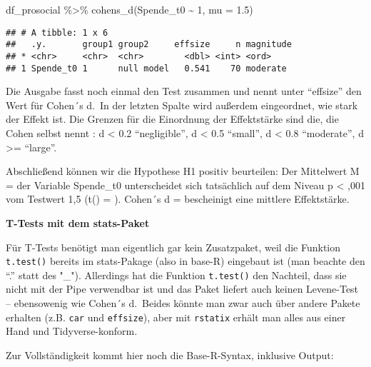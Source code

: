 \documentclass[
]{book}
\newenvironment{Shaded}{\begin{snugshade}}{\end{snugshade}}
\newcommand{\AttributeTok}[1]{\textcolor[rgb]{0.77,0.63,0.00}{#1}}
\newcommand{\DecValTok}[1]{\textcolor[rgb]{0.00,0.00,0.81}{#1}}
\newcommand{\FloatTok}[1]{\textcolor[rgb]{0.00,0.00,0.81}{#1}}
\newcommand{\FunctionTok}[1]{\textcolor[rgb]{0.00,0.00,0.00}{#1}}
\newcommand{\NormalTok}[1]{#1}
\newcommand{\SpecialCharTok}[1]{\textcolor[rgb]{0.00,0.00,0.00}{#1}}
\newcommand{\StringTok}[1]{\textcolor[rgb]{0.31,0.60,0.02}{#1}}
\begin{document}
\begin{Shaded}
\begin{Highlighting}[]
\NormalTok{df\_prosocial }\SpecialCharTok{\%\textgreater{}\%} 
  \FunctionTok{cohens\_d}\NormalTok{(Spende\_t0 }\SpecialCharTok{\textasciitilde{}} \DecValTok{1}\NormalTok{, }\AttributeTok{mu =} \FloatTok{1.5}\NormalTok{) }
\end{Highlighting}
\end{Shaded}

\begin{verbatim}
## # A tibble: 1 x 6
##   .y.       group1 group2     effsize     n magnitude
## * <chr>     <chr>  <chr>        <dbl> <int> <ord>    
## 1 Spende_t0 1      null model   0.541    70 moderate
\end{verbatim}

Die Ausgabe fasst noch einmal den Test zusammen und nennt unter ``effsize'' den Wert für Cohen´s d.~In der letzten Spalte wird außerdem eingeordnet, wie stark der Effekt ist. Die Grenzen für die Einordnung der Effektstärke sind die, die Cohen selbst nennt \citep{Cohen_1992}: \textbar d\textbar{} \textless{} 0.2 ``negligible'', \textbar d\textbar{} \textless{} 0.5 ``small'', \textbar d\textbar{} \textless{} 0.8 ``moderate'', \textbar d\textbar{} \textgreater= ``large''.

Abschließend können wir die Hypothese H1 positiv beurteilen: Der Mittelwert M =  der Variable Spende\_t0 unterscheidet sich tatsächlich auf dem Niveau p \textless{} ,001 vom Testwert 1,5 (t() = ). Cohen´s d =  bescheinigt eine mittlere Effektstärke.

\leavevmode\hypertarget{info_levene}{}%
\textbf{T-Tests mit dem stats-Paket}

Für T-Tests benötigt man eigentlich gar kein Zusatzpaket, weil die Funktion \texttt{t.test()} bereits im stats-Pakage (also in base-R) eingebaut ist (man beachte den ``.'' statt des "\_"). Allerdings hat die Funktion \texttt{t.test()} den Nachteil, dass sie nicht mit der Pipe verwendbar ist und das Paket liefert auch keinen Levene-Test -- ebensowenig wie Cohen´s d.~Beides könnte man zwar auch über andere Pakete erhalten (z.B. \texttt{car} und \texttt{effsize}), aber mit \texttt{rstatix} erhält man alles aus einer Hand und Tidyverse-konform.

Zur Vollständigkeit kommt hier noch die Base-R-Syntax, inklusive Output:

\begin{Shaded}
\end{Shaded}
\end{document}
